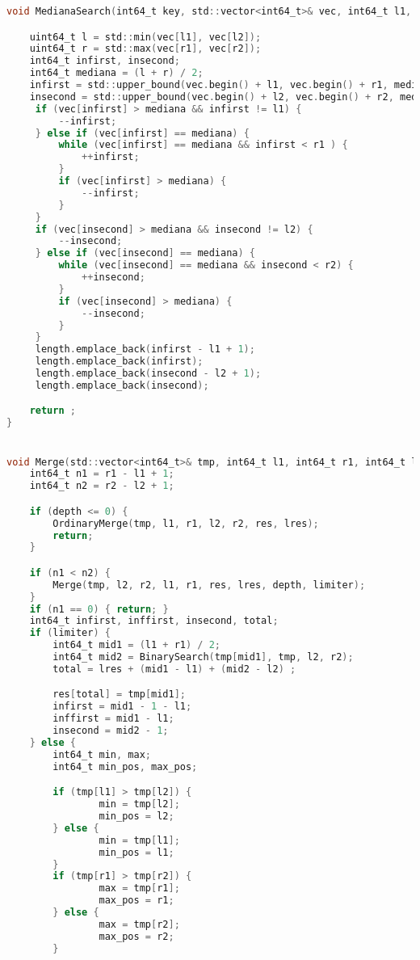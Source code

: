 \begin{lstlisting}[language=C]
void MedianaSearch(int64_t key, std::vector<int64_t>& vec, int64_t l1, int64_t r1, int64_t l2, int64_t r2, std::vector<int64_t>& length) {

    uint64_t l = std::min(vec[l1], vec[l2]);
    uint64_t r = std::max(vec[r1], vec[r2]);
    int64_t infirst, insecond;
    int64_t mediana = (l + r) / 2;
    infirst = std::upper_bound(vec.begin() + l1, vec.begin() + r1, mediana) - vec.begin();
    insecond = std::upper_bound(vec.begin() + l2, vec.begin() + r2, mediana) - vec.begin();
     if (vec[infirst] > mediana && infirst != l1) {
         --infirst;
     } else if (vec[infirst] == mediana) {
         while (vec[infirst] == mediana && infirst < r1 ) {
             ++infirst;
         }
         if (vec[infirst] > mediana) {
             --infirst;
         }
     }
     if (vec[insecond] > mediana && insecond != l2) {
         --insecond;
     } else if (vec[insecond] == mediana) {
         while (vec[insecond] == mediana && insecond < r2) {
             ++insecond;
         }
         if (vec[insecond] > mediana) {
             --insecond;
         }
     }
     length.emplace_back(infirst - l1 + 1);
     length.emplace_back(infirst);
     length.emplace_back(insecond - l2 + 1);
     length.emplace_back(insecond);

    return ;
}


void Merge(std::vector<int64_t>& tmp, int64_t l1, int64_t r1, int64_t l2, int64_t r2, std::vector<int64_t>& res, int64_t lres, int64_t depth, bool limiter) {
    int64_t n1 = r1 - l1 + 1;
    int64_t n2 = r2 - l2 + 1;

    if (depth <= 0) {
        OrdinaryMerge(tmp, l1, r1, l2, r2, res, lres);
        return;
    }

    if (n1 < n2) {
        Merge(tmp, l2, r2, l1, r1, res, lres, depth, limiter);
    }
    if (n1 == 0) { return; }
    int64_t infirst, inffirst, insecond, total;
    if (limiter) {
        int64_t mid1 = (l1 + r1) / 2;
        int64_t mid2 = BinarySearch(tmp[mid1], tmp, l2, r2);
        total = lres + (mid1 - l1) + (mid2 - l2) ;

        res[total] = tmp[mid1];
        infirst = mid1 - 1 - l1;
        inffirst = mid1 - l1;
        insecond = mid2 - 1;
    } else {
        int64_t min, max;
        int64_t min_pos, max_pos;

        if (tmp[l1] > tmp[l2]) {
                min = tmp[l2];
                min_pos = l2;
        } else {
                min = tmp[l1];
                min_pos = l1;
        }
        if (tmp[r1] > tmp[r2]) {
                max = tmp[r1];
                max_pos = r1;
        } else {
                max = tmp[r2];
                max_pos = r2;
        }


\end{lstlisting}
